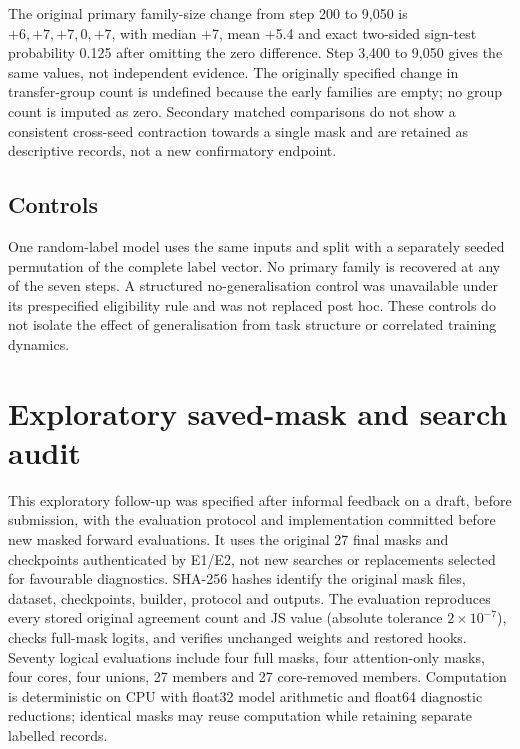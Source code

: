 \documentclass[10pt]{article}
\begin{document}
The original primary family-size change from step 200 to 9,050 is $+6,+7,+7,0,+7$, with median +7, mean +5.4 and exact two-sided sign-test probability 0.125 after omitting the zero difference. Step 3,400 to 9,050 gives the same values, not independent evidence. The originally specified change in transfer-group count is undefined because the early families are empty; no group count is imputed as zero. Secondary matched comparisons do not show a consistent cross-seed contraction towards a single mask and are retained as descriptive records, not a new confirmatory endpoint.

\subsection{Controls}
One random-label model uses the same inputs and split with a separately seeded permutation of the complete label vector. No primary family is recovered at any of the seven steps. A structured no-generalisation control was unavailable under its prespecified eligibility rule and was not replaced post hoc. These controls do not isolate the effect of generalisation from task structure or correlated training dynamics.

\section{Exploratory saved-mask and search audit}
\label{sec:reviewfollowup}
This exploratory follow-up was specified after informal feedback on a draft, before submission, with the evaluation protocol and implementation committed before new masked forward evaluations. It uses the original 27 final masks and checkpoints authenticated by E1/E2, not new searches or replacements selected for favourable diagnostics. SHA-256 hashes identify the original mask files, dataset, checkpoints, builder, protocol and outputs. The evaluation reproduces every stored original agreement count and JS value (absolute tolerance $2\times10^{-7}$), checks full-mask logits, and verifies unchanged weights and restored hooks. Seventy logical evaluations include four full masks, four attention-only masks, four cores, four unions, 27 members and 27 core-removed members. Computation is deterministic on CPU with float32 model arithmetic and float64 diagnostic reductions; identical masks may reuse computation while retaining separate labelled records.
\end{document}

